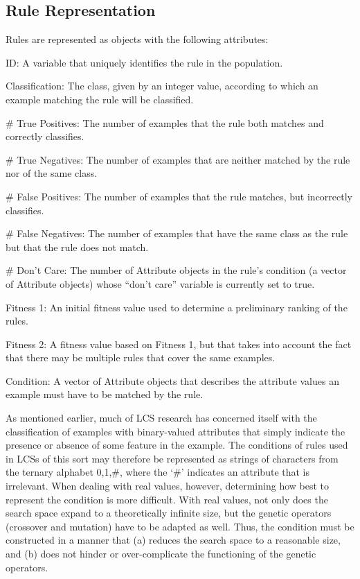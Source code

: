 \documentclass[11pt]{article}
\begin{document}
\subsection{Rule Representation}

Rules are represented as objects with the following attributes:

\begin{description}
\item ID: A variable that uniquely identifies the rule in the population.
\item Classification: The class, given by an integer value, according to which an example matching the rule will be classified.
\item \# True Positives: The number of examples that the rule both matches and correctly classifies.
\item \# True Negatives: The number of examples that are neither matched by the rule nor of the same class.
\item \# False Positives: The number of examples that the rule matches, but incorrectly classifies.
\item \# False Negatives: The number of examples that have the same class as the rule but that the rule does not match.
\item \# Don't Care: The number of Attribute objects in the rule's condition (a vector of Attribute objects) whose ``don't care'' variable is currently set to true.
\item Fitness 1: An initial fitness value used to determine a preliminary ranking of the rules.
\item Fitness 2: A fitness value based on Fitness 1, but that takes into account the fact that there may be multiple rules that cover the same examples.
\item Condition: A vector of Attribute objects that describes the attribute values an example must have to be matched by the rule.
\end{description}

As mentioned earlier, much of LCS research has concerned itself with the classification of examples with binary-valued attributes that simply indicate the presence or absence of some feature in the example. The conditions of rules used in LCSs of this sort may therefore be represented as strings of characters from the ternary alphabet {0,1,\#}, where the `\#' indicates an attribute that is irrelevant. When dealing with real values, however, determining how best to represent the condition is more difficult. With real values, not only does the search space expand to a theoretically infinite size, but the genetic operators (crossover and mutation) have to be adapted as well. Thus, the condition must be constructed in a manner that (a) reduces the search space to a reasonable size, and (b) does not hinder or over-complicate the functioning of the genetic operators.
\end{document}
